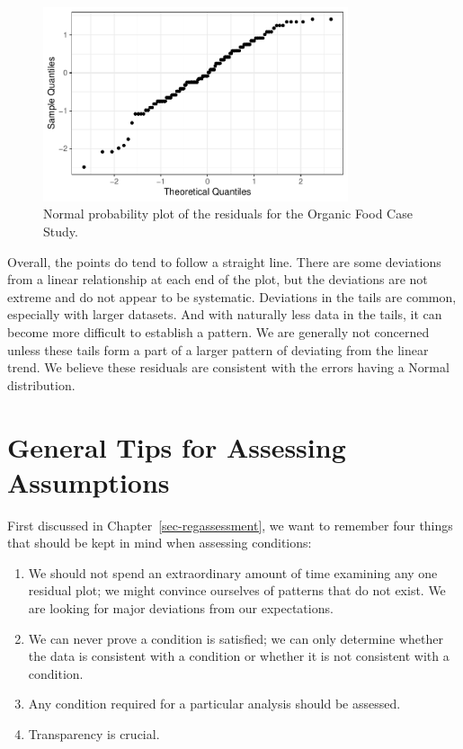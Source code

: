 \documentclass[
  letterpaper,
  DIV=11,
  numbers=noendperiod]{scrreprt}
\providecommand{\tightlist}{%
  \setlength{\itemsep}{0pt}\setlength{\parskip}{0pt}}\usepackage{longtable,booktabs,array}
\theoremstyle{definition}
\theoremstyle{definition}
\theoremstyle{plain}
\theoremstyle{remark}
\begin{document}
\begin{figure}

{\centering \includegraphics[width=0.8\textwidth,height=\textheight]{./images/fig-anovaassessment-normal-organic-1.pdf}

}

\caption{\label{fig-anovaassessment-normal-organic}Normal probability
plot of the residuals for the Organic Food Case Study.}

\end{figure}

Overall, the points do tend to follow a straight line. There are some
deviations from a linear relationship at each end of the plot, but the
deviations are not extreme and do not appear to be systematic.
Deviations in the tails are common, especially with larger datasets. And
with naturally less data in the tails, it can become more difficult to
establish a pattern. We are generally not concerned unless these tails
form a part of a larger pattern of deviating from the linear trend. We
believe these residuals are consistent with the errors having a Normal
distribution.

\hypertarget{general-tips-for-assessing-assumptions-1}{%
\section{General Tips for Assessing
Assumptions}\label{general-tips-for-assessing-assumptions-1}}

First discussed in Chapter~\ref{sec-regassessment}, we want to remember
four things that should be kept in mind when assessing conditions:

\begin{enumerate}
\def\labelenumi{\arabic{enumi}.}
\tightlist
\item
  We should not spend an extraordinary amount of time examining any one
  residual plot; we might convince ourselves of patterns that do not
  exist. We are looking for major deviations from our expectations.
\item
  We can never prove a condition is satisfied; we can only determine
  whether the data is consistent with a condition or whether it is not
  consistent with a condition.
\item
  Any condition required for a particular analysis should be assessed.
\item
  Transparency is crucial.
\end{enumerate}
\end{document}
